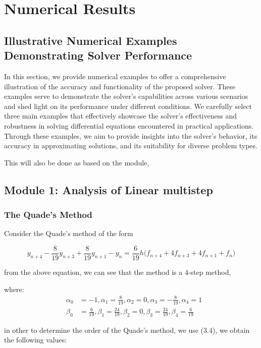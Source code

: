 \chapter{Numerical Results}
\section*{Illustrative Numerical Examples Demonstrating Solver Performance}

In this section, we provide numerical examples to offer a comprehensive illustration of the accuracy and functionality of the proposed solver. These examples serve to demonstrate the solver's capabilities across various scenarios and shed light on its performance under different conditions. We carefully select three main examples that effectively showcase the solver's effectiveness and robustness in solving differential equations encountered in practical applications. Through these examples, we aim to provide insights into the solver's behavior, its accuracy in approximating solutions, and its suitability for diverse problem types.

This will also be done as based on the module,


\section{Module 1: Analysis of Linear multistep}
\subsection{The Quade's Method}
Consider the Quade's method of the form \cite{lambert1977}

\begin{equation}
    y_{n+4} - \frac{8}{19}y_{n+3} + \frac{8}{19}y_{n+1} - y_{n} =  \frac{6}{19}h\bigl(f_{n+4}+4f_{n+3}+4f_{n+1}+f_{n}\bigr)
\end{equation}


from the above equation, we can see that the method is a 4-step method,


where:
\[
\begin{aligned}&\alpha_0 &= -1, \alpha_1 = \frac{8}{19}, \alpha_2 = 0, \alpha_3 = -\frac{8}{19}, \alpha_4 = 1 \\
&\beta_0 &= \frac{6}{19}, \beta_1 = \frac{24}{19}, \beta_2 = 0, \beta_3 = \frac{24}{19}, \beta_4 = \frac{6}{19} 
\end{aligned}
\]

in other to determine the order of the Quade's method, we use (3.4), we obtain the following values:


